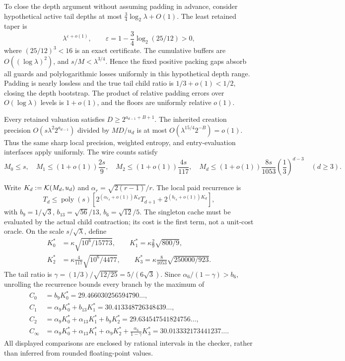 To close the depth argument without assuming padding in advance, consider
hypothetical active tail depths at most $\frac34\log_2\lambda+O(1)$.
The least retained taper is
\[
 \lambda^{\varepsilon+o(1)},\qquad
 \varepsilon=1-\frac34\log_2(25/12)>0,
\]
where $(25/12)^3<16$ is an exact certificate. The cumulative buffers are
$O((\log\lambda)^2)$, and $s/M<\lambda^{3/4}$. Hence the fixed positive
packing gaps absorb all guards and polylogarithmic losses uniformly in
this hypothetical depth range. Padding is nearly lossless and the true
tail child ratio is $1/3+o(1)<1/2$, closing the depth bootstrap.
The product of relative padding errors over $O(\log\lambda)$ levels is
$1+o(1)$, and the floors are uniformly relative $o(1)$.

Every retained valuation satisfies $D\ge2^{a_{d-1}+B+1}$. The inherited
creation precision $O(s\lambda^2 2^{a_{d-1}})$ divided by $MD/u_d$ is at
most $O(\lambda^{15/4}2^{-B})=o(1)$. Thus the same sharp local precision,
weighted entropy, and entry-evaluation interfaces apply uniformly.
The wire counts satisfy
\[
 M_0\le s,\quad M_1\le(1+o(1))\frac{2s}{9},\quad
 M_2\le(1+o(1))\frac{4s}{117},\quad
 M_d\le(1+o(1))\frac{8s}{1053}\left(\frac13\right)^{d-3}
 \quad(d\ge3).
\]

Write $K_d:=\mathcal K(M_d,u_d)$ and $\alpha_r=\sqrt{2(r-1)}/r$.
The local paid recurrence is
\[
 T_d\le\operatorname{poly}(s)
 \left[2^{(\alpha_{r_d}+o(1))K_d}T_{d+1}
       +2^{(b_{r_d}+o(1))K_d}\right],
\]
with $b_9=1/\sqrt3$, $b_{13}=\sqrt{56}/13$, $b_6=\sqrt{12}/5$.
The singleton cache must be evaluated by the actual child contraction;
its cost is the first term, not a unit-cost oracle.
On the scale $s/\sqrt\lambda$, define
\[
\begin{split}
 K_0^*&=\kappa\sqrt{10^6/15773},\qquad
 K_1^*=\kappa\frac29\sqrt{800/9},\\
 K_2^*&=\kappa\frac4{117}\sqrt{10^6/4477},\qquad
 K_3^*=\kappa\frac8{1053}\sqrt{250000/923}.
\end{split}
\]
The tail ratio is $\gamma=(1/3)/\sqrt{12/25}=5/(6\sqrt3)$.
Since $\alpha_6/(1-\gamma)>b_6$, unrolling the recurrence bounds every
branch by the maximum of
\[
\begin{aligned}
 C_0&=b_9K_0^*=29.466030256594790\ldots,\\
 C_1&=\alpha_9K_0^*+b_{13}K_1^*
      =30.413348726348439\ldots,\\
 C_2&=\alpha_9K_0^*+\alpha_{13}K_1^*+b_9K_2^*
      =29.634547541824756\ldots,\\
 C_\infty&=\alpha_9K_0^*+\alpha_{13}K_1^*+\alpha_9K_2^*
              +\frac{\alpha_6}{1-\gamma}K_3^*
      =30.013332173441237\ldots.
\end{aligned}
\]
All displayed comparisons are enclosed by rational intervals in the
checker, rather than inferred from rounded floating-point values.

